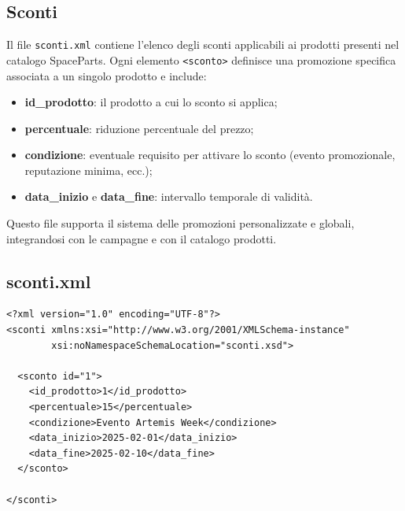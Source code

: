 \documentclass[a4paper,12pt]{report}
\begin{document}

\subsection*{Sconti}
\label{sec:xml-sconti}

Il file \texttt{sconti.xml} contiene l'elenco degli sconti applicabili ai prodotti
presenti nel catalogo SpaceParts. Ogni elemento \texttt{<sconto>} definisce una
promozione specifica associata a un singolo prodotto e include:

\begin{itemize}
    \item \textbf{id\_prodotto}: il prodotto a cui lo sconto si applica;
    \item \textbf{percentuale}: riduzione percentuale del prezzo;
    \item \textbf{condizione}: eventuale requisito per attivare lo sconto 
          (evento promozionale, reputazione minima, ecc.);
    \item \textbf{data\_inizio} e \textbf{data\_fine}: intervallo temporale di validità.
\end{itemize}

Questo file supporta il sistema delle promozioni personalizzate e globali,
integrandosi con le campagne e con il catalogo prodotti.

\subsection*{sconti.xml}
{\footnotesize
\begin{lstlisting}
<?xml version="1.0" encoding="UTF-8"?>
<sconti xmlns:xsi="http://www.w3.org/2001/XMLSchema-instance"
        xsi:noNamespaceSchemaLocation="sconti.xsd">

  <sconto id="1">
    <id_prodotto>1</id_prodotto>
    <percentuale>15</percentuale>
    <condizione>Evento Artemis Week</condizione>
    <data_inizio>2025-02-01</data_inizio>
    <data_fine>2025-02-10</data_fine>
  </sconto>

</sconti>
\end{lstlisting}}
\end{document}
